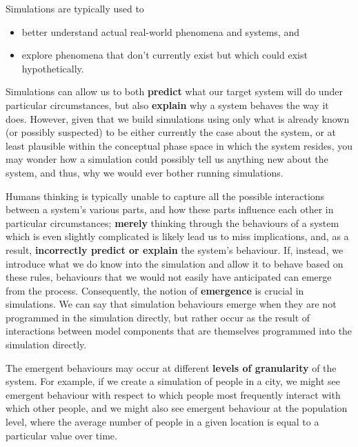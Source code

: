 Simulations are typically used to 
\begin{itemize}[noitemsep]
\item better understand actual real-world phenomena and systems, and 
\item explore phenomena that don't currently exist but which could exist hypothetically. 
\end{itemize}
Simulations can allow us to both \textbf{predict} what our target system will do under particular circumstances, but also \textbf{explain} why a system behaves the way it does. However, given that we build simulations using only what is already known (or possibly suspected) to be either currently the case about the system, or at least plausible within the conceptual phase space in which the system resides, you may wonder how a simulation could possibly tell us anything new about the system, and thus, why we would ever bother running simulations. \par Humans thinking is typically unable to capture all the possible interactions between a system's various parts, and how these parts influence each other in particular circumstances; \textbf{merely} thinking through the behaviours of a system which is even slightly complicated is likely lead us to miss implications, and, as a result, \textbf{incorrectly predict or explain} the system's behaviour. If, instead, we introduce what we do know into the simulation and allow it to behave based on these rules, behaviours that we would not easily have anticipated can emerge from the process.
\newpage\noindent Consequently, the notion of \textbf{emergence} is crucial in simulations. We can say that simulation behaviours emerge when they are not programmed in the simulation directly, but rather occur as the result of interactions between model components that are themselves programmed into the simulation directly. \par The emergent behaviours may occur at different \textbf{levels of granularity} of the system. For example, if we create a simulation of people in a city, we might see emergent behaviour with respect to which people most frequently interact with which other people, and we might also see emergent behaviour at the population level, where the average number of people in a given location is equal to a particular value over time.

